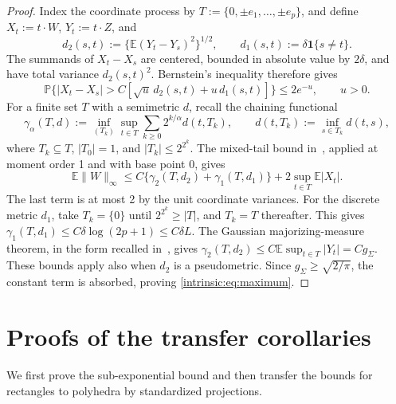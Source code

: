 \documentclass[11pt,letterpaper]{article}
\newenvironment{recovered}{}{}
\newenvironment{vSixBlock}{\color{magenta}}{}
\theoremstyle{remark}
\newcommand{\E}{\mathbb E}
\newcommand{\Pp}{\mathbb P}
\newcommand{\ind}{\mathbf 1}
\begin{document}
\begin{vSixBlock}
\begin{proof}
Index the coordinate process by \(T:=\{0,\pm e_1,\ldots,\pm e_p\}\),
and define \(X_t:=t\cdot W\), \(Y_t:=t\cdot Z\), and
\[
 d_2(s,t):=\{\E(Y_t-Y_s)^2\}^{1/2},\qquad
 d_1(s,t):=\delta\ind\{s\ne t\}.
\]
The summands of \(X_t-X_s\) are centered, bounded in absolute value
by \(2\delta\), and have total variance \(d_2(s,t)^2\).
Bernstein's inequality therefore gives
\[
 \Pp\{|X_t-X_s|>C[\sqrt u\,d_2(s,t)+u\,d_1(s,t)]\}
 \le2e^{-u},\qquad u>0.
\]
For a finite set \(T\) with a semimetric \(d\), recall the chaining
functional
\[
 \gamma_\alpha(T,d):=
 \inf_{(T_k)}\sup_{t\in T}\sum_{k\ge0}2^{k/\alpha}d(t,T_k),
 \qquad d(t,T_k):=\inf_{s\in T_k}d(t,s),
\]
where \(T_k\subseteq T\), \(|T_0|=1\), and
\(|T_k|\le2^{2^k}\). The mixed-tail bound
in~\cite[Theorem~3.5]{Dirksen2015}, applied at moment order 1 and
with base point \(0\), gives
\[
 \E\|W\|_\infty
 \le C\{\gamma_2(T,d_2)+\gamma_1(T,d_1)\}
       +2\sup_{t\in T}\E|X_t|.
\]
The last term is at most 2 by the unit coordinate variances.
For the discrete metric \(d_1\), take \(T_k=\{0\}\) until
\(2^{2^k}\ge|T|\), and \(T_k=T\) thereafter. This gives
\(\gamma_1(T,d_1)\le C\delta\log(2p+1)\le C\delta L\).
The Gaussian majorizing-measure theorem, in the form recalled
in~\cite[Remark~3.3(i)]{Dirksen2015}, gives
\(\gamma_2(T,d_2)\le C\E\sup_{t\in T}|Y_t|=Cg_\Sigma\).
These bounds apply also when \(d_2\) is a pseudometric. Since
\(g_\Sigma\ge\sqrt{2/\pi}\), the constant term is absorbed, proving
\eqref{intrinsic:eq:maximum}.
\end{proof}
\end{vSixBlock}

\section{Proofs of the transfer corollaries}\label{app:transfers}

\begin{recovered}
We first prove the sub-exponential bound and then transfer the bounds
for rectangles to polyhedra by standardized projections.
\end{recovered}
\end{document}

